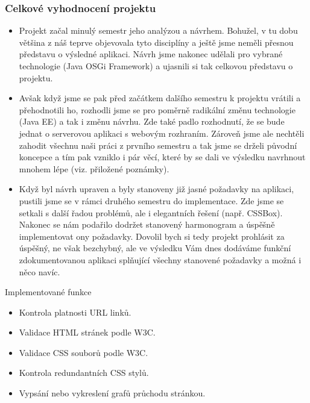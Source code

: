 \documentclass{beamer}
\begin{document}
\begin{frame}[allowframebreaks]\frametitle{Celkové vyhodnocení projektu}

	\begin{itemize}
		\item Projekt začal minulý semestr jeho analýzou a návrhem. Bohužel, v tu dobu většina z náš teprve objevovala tyto disciplíny a ještě jsme neměli přesnou představu o výsledné aplikaci. Návrh jsme nakonec udělali pro vybrané technologie (Java OSGi Framework) a ujasnili si tak celkovou představu o projektu. 
		\item Avšak když jsme se pak před začátkem dalšího semestru k projektu vrátili a přehodnotili ho, rozhodli jsme se pro poměrně radikální změnu technologie (Java EE) a tak i změnu návrhu. Zde také padlo rozhodnutí, že se bude jednat o serverovou aplikaci s webovým rozhraním. Zároveň jsme ale nechtěli zahodit všechnu naši práci z prvního semestru a tak jsme se drželi původní koncepce a tím pak vzniklo i pár věcí, které by se dali ve výsledku navrhnout mnohem lépe (viz. přiložené poznámky).
		\item Když byl návrh upraven a byly stanoveny již jasné požadavky na aplikaci, pustili jsme se v rámci druhého semestru do implementace. Zde jsme se setkali s další řadou problémů, ale i elegantních řešení (např. CSSBox). Nakonec se nám podařilo dodržet stanovený harmonogram a úspěšně implementovat ony požadavky. Dovolil bych si tedy projekt prohlásit za úspěšný, ne však bezchybný, ale ve výsledku Vám dnes dodáváme funkční zdokumentovanou aplikaci splňující všechny stanovené požadavky a možná i něco navíc.
	\end{itemize}
	
		\begin{block}{Implementované funkce}
			\begin{itemize}
				\item Kontrola platnosti URL linků.
				\item Validace HTML stránek podle W3C.
				\item Validace CSS souborů podle W3C.
				\item Kontrola redundantních CSS stylů.
				\item Vypsání nebo vykreslení grafů průchodu stránkou.
			\end{itemize}
		\end{block}
   
\end{frame}
\end{document}
